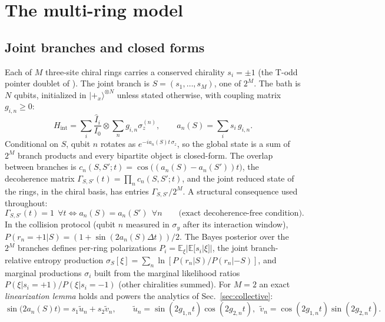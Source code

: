 \documentclass[11pt]{article}
\newcommand{\Iop}{\hat{I}}
\begin{document}
\section{The multi-ring model}\label{sec:model}

\subsection{Joint branches and closed forms}

Each of $M$ three-site chiral rings carries a conserved chirality $s_i=\pm1$ (the T-odd pointer doublet of \cite{Lejri2026}). The joint branch is $S=(s_1,\dots,s_M)$, one of $2^M$. The bath is $N$ qubits, initialized in $|+_x\rangle^{\otimes N}$ unless stated otherwise, with coupling matrix $g_{i,n}\ge0$:
\begin{equation}
H_{\mathrm{int}}=\sum_i \frac{\Iop_i}{I_0}\otimes\sum_n g_{i,n}\sigma_z^{(n)},
\qquad
a_n(S)=\sum_i s_i\, g_{i,n}.
\end{equation}
Conditional on $S$, qubit $n$ rotates as $e^{-i a_n(S)t\,\sigma_z}$, so the global state is a sum of $2^M$ branch products and every bipartite object is closed-form. The overlap between branches is $c_n(S,S';t)=\cos\!\big((a_n(S)-a_n(S'))t\big)$, the decoherence matrix $\Gamma_{S,S'}(t)=\prod_n c_n(S,S';t)$, and the joint reduced state of the rings, in the chiral basis, has entries $\Gamma_{S,S'}/2^M$. A structural consequence used throughout:
\begin{equation}
\Gamma_{S,S'}(t)=1\ \ \forall t \iff a_n(S)=a_n(S')\ \ \forall n
\qquad\text{(exact decoherence-free condition).}
\label{eq:dfs}
\end{equation}
In the collision protocol (qubit $n$ measured in $\sigma_y$ after its interaction window), $P(r_n{=}{+}1|S)=(1+\sin(2a_n(S)\Delta t))/2$. The Bayes posterior over the $2^M$ branches defines per-ring polarizations $P_i=\mathbb E_\xi|\mathbb E[s_i|\xi]|$, the joint branch-relative entropy production $\sigma_S[\xi]=\sum_n\ln[P(r_n|S)/P(r_n|{-}S)]$, and marginal productions $\sigma_i$ built from the marginal likelihood ratios $P(\xi|s_i{=}{+}1)/P(\xi|s_i{=}{-}1)$ (other chiralities summed). For $M{=}2$ an exact \emph{linearization lemma} holds and powers the analytics of Sec.~\ref{sec:collective}:
\begin{equation}
\sin\!\big(2a_n(S)t\big)=s_1\tilde u_n+s_2\tilde v_n,
\qquad
\tilde u_n=\sin(2g_{1,n}t)\cos(2g_{2,n}t),\ \
\tilde v_n=\cos(2g_{1,n}t)\sin(2g_{2,n}t).
\label{eq:linlemma}
\end{equation}
\end{document}
